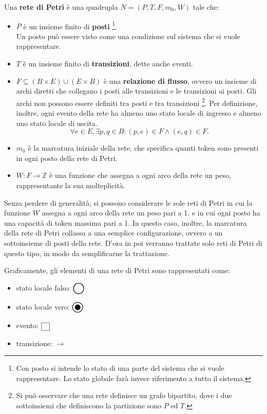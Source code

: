 \begin{defn}
    Una \textbf{rete di Petri} è una quadrupla $N = (P, T, F, m_0, W)$ tale che:
    \begin{itemize}
        \item $P$ è un insieme finito di \textbf{posti}
        \footnote{Con posto si intende lo stato di una parte del sistema
        che si vuole rappresentare. Lo stato globale farà invece riferimento a
        tutto il sistema.}.\\
        Un posto può essere visto come una condizione sul sistema che
        si vuole rappresentare.
        \item $T$ è un insieme finito di \textbf{transizioni}, dette anche
        eventi.
        \item $F \subseteq (B\times E)\cup(E\times B)$
        è una \textbf{relazione di flusso}, ovvero un insieme di
        archi diretti che collegano i posti alle transizioni e le transizioni
        ai posti. Gli archi non possono essere definiti tra posti e tra
        transizioni
        \footnote{Si può osservare che una rete definisce un grafo bipartito,
        dove i due sottoinsiemi che definiscono la partizione sono $P$ ed $T$.}.
        Per definizione, inoltre, ogni evento della rete ha almeno uno stato
        locale di ingresso e almeno uno stato locale di uscita.
        \[
            \forall e \in E, \exists p, q \in B : (p, e) \in F \land
            (e, q) \in F.
        \]
        \item $m_0$ è la marcatura iniziale della rete, che specifica quanti
        token sono presenti in ogni posto della rete di Petri.
        \item $W: F \rightarrow \mathbb{Z}$ è una funzione che assegna a ogni
        arco della rete un peso, rappresentante la sua molteplicità.
    \end{itemize}
\end{defn}
Senza perdere di generalità, si possono considerare le sole reti di Petri
in cui la funzione $W$ assegna a ogni arco della rete un peso pari a 1,
e in cui ogni posto ha una capacità di token massima pari a 1.
In questo caso, inoltre, la marcatura della rete di Petri collassa a una semplice
configurazione, ovvero a un sottoinsieme di posti della rete.
D'ora in poi verranno trattate solo reti di Petri di questo tipo, in modo
da semplificarne la trattazione.

Graficamente, gli elementi di una rete di Petri sono rappresentati come:
\begin{itemize}
    \item stato locale falso: $\fPlace$
    \item stato locale vero: $\tPlace$
    \item evento: $\event$
    \item transizione: $\longrightarrow$
\end{itemize}

